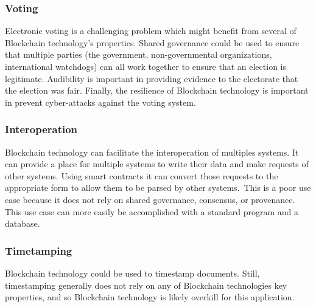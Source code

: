 \subsubsection{Voting}
Electronic voting is a challenging problem which might benefit from several of Blockchain technology's properties.
Shared governance could be used to ensure that multiple parties (the government, non-governmental organizations, international watchdogs) can all work together to ensure that an election is legitimate.
Audibility is important in providing evidence to the electorate that the election was fair.
Finally, the resilience of Blockchain technology is important in prevent cyber-attacks against the voting system.

\subsubsection{Interoperation}
Blockchain technology can facilitate the interoperation of multiples systems.
It can provide a place for multiple systems to write their data and make requests of other systems.
Using smart contracts it can convert those requests to the appropriate form to allow them to be parsed by other systems.\
This is a poor use case because it does not rely on shared governance, consensus, or provenance.
This use case can more easily be accomplished with a standard program and a database.

\subsubsection{Timetamping}
Blockchain technology could be used to timestamp documents. Still, timestamping generally does not rely on any of Blockchain technologies key properties, and so Blockchain technology is likely overkill for this application.
